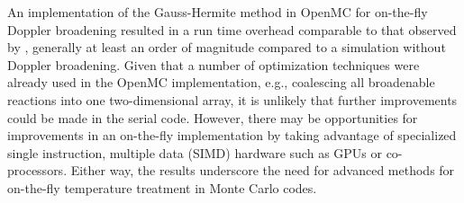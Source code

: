 \documentclass[3p,authoryear]{elsarticle}
\begin{document}
An implementation of the Gauss-Hermite method in OpenMC for on-the-fly Doppler
broadening resulted in a run time overhead comparable to that observed by
\citet{nd-dean-2010}, generally at least an order of magnitude compared to a
simulation without Doppler broadening. Given that a number of optimization
techniques were already used in the OpenMC implementation, e.g., coalescing all
broadenable reactions into one two-dimensional array, it is unlikely that
further improvements could be made in the serial code. However, there may be
opportunities for improvements in an on-the-fly implementation by taking
advantage of specialized single instruction, multiple data (SIMD) hardware such
as GPUs or co-processors. Either way, the results underscore the need for
advanced methods for on-the-fly temperature treatment in Monte Carlo codes.




\end{document}
